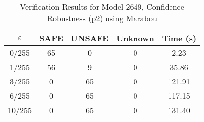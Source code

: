 \begin{table}[htbp]
\centering
\caption{Verification Results for Model 2649, Confidence Robustness (p2) using Marabou}
\label{tab:model2649_p2_marabou}
\begin{tabular}{|c|c|c|c|c|}
\hline
$\varepsilon$ & SAFE & UNSAFE & Unknown & Time (s) \\ \hline
0/255 & 65 & 0 & 0 & 2.23 \\ \hline
1/255 & 56 & 9 & 0 & 35.86 \\ \hline
3/255 & 0 & 65 & 0 & 121.91 \\ \hline
6/255 & 0 & 65 & 0 & 117.15 \\ \hline
10/255 & 0 & 65 & 0 & 131.40 \\ \hline
\end{tabular}
\end{table}

